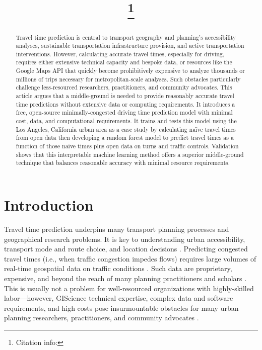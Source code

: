 \documentclass[12pt,letterpaper]{article} %
\begin{document}
\title{\papertitle\footnote{{Citation info: \papercitation}}}
\author[]{\myname}
\affil[]{\myaffiliation}
\date{}

\maketitle

\begin{abstract}

Travel time prediction is central to transport geography and planning's accessibility analyses, sustainable transportation infrastructure provision, and active transportation interventions. However, calculating accurate travel times, especially for driving, requires either extensive technical capacity and bespoke data, or resources like the Google Maps API that quickly become prohibitively expensive to analyze thousands or millions of trips necessary for metropolitan-scale analyses. Such obstacles particularly challenge less-resourced researchers, practitioners, and community advocates. This article argues that a middle-ground is needed to provide reasonably accurate travel time predictions without extensive data or computing requirements. It introduces a free, open-source minimally-congested driving time prediction model with minimal cost, data, and computational requirements. It trains and tests this model using the Los Angeles, California urban area as a case study by calculating naïve travel times from open data then developing a random forest model to predict travel times as a function of those naïve times plus open data on turns and traffic controls. Validation shows that this interpretable machine learning method offers a superior middle-ground technique that balances reasonable accuracy with minimal resource requirements.

\end{abstract}

\section{Introduction}

Travel time prediction underpins many transport planning processes and geographical research problems. It is key to understanding urban accessibility, transport mode and route choice, and location decisions \citep{zhang2015gradient,jenelius2013travel}. Predicting congested travel times (i.e., when traffic congestion impedes flows) requires large volumes of real-time geospatial data on traffic conditions \citep[e.g.,][]{hou2018network}. Such data are proprietary, expensive, and beyond the reach of many planning practitioners and scholars \citep{carrion2012value,wang2011estimating}. This is usually not a problem for well-resourced organizations with highly-skilled labor---however, GIScience technical expertise, complex data and software requirements, and high costs pose insurmountable obstacles for many urban planning researchers, practitioners, and community advocates \citep{giles2022creating}.
\end{document}
